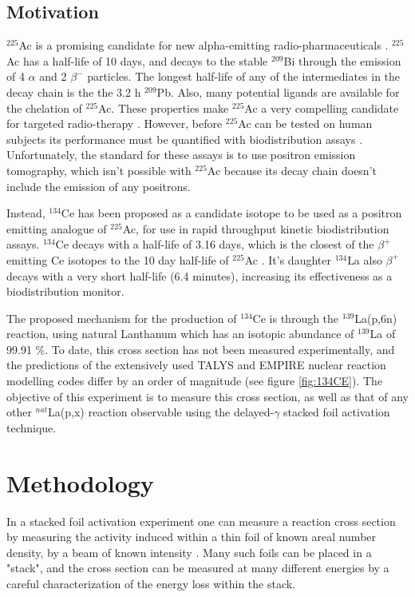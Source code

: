 \documentclass[aps,twocolumn,secnumarabic,balancelastpage,amsmath,amssymb,nofootinbib,floatfix]{revtex4-1}
\begin{document}
\subsection{Motivation}
$^{225}$Ac is a promising candidate for new alpha-emitting radio-pharmaceuticals \cite{BOLL2005667}.  $^{225}$Ac has a half-life of 10 days, and decays to the stable $^{209}$Bi through the emission of 4 $\alpha$ and 2 $\beta^-$ particles. The longest half-life of any of the intermediates in the decay chain is the the 3.2 h $^{209}$Pb.  Also, many potential ligands are available for the chelation of $^{225}$Ac.  These properties make $^{225}$Ac a very compelling candidate for targeted radio-therapy \cite{BOLL2005667}.  However, before $^{225}$Ac can be tested on human subjects its performance must be quantified with biodistribution assays \cite{doi:10.1021/ac0580114}.  Unfortunately, the standard for these assays is to use positron emission tomography, which isn't possible with $^{225}$Ac because its decay chain doesn't include the emission of any positrons.

Instead, $^{134}$Ce has been proposed as a candidate isotope to be used as a positron emitting analogue of $^{225}$Ac, for use in rapid throughput kinetic biodistribution assays.  $^{134}$Ce decays with a half-life of 3.16 days, which is the closest of the $\beta^+$ emitting Ce isotopes to the 10 day half-life of $^{225}$Ac \cite{ensdf}.  It's daughter $^{134}$La also $\beta^+$ decays with a very short half-life (6.4 minutes), increasing its effectiveness as a biodistribution monitor.  

The proposed mechanism for the production of $^{134}$Ce is through the $^{139}$La(p,6n) reaction, using natural Lanthanum which has an isotopic abundance of $^{139}$La of 99.91 \%.  To date, this cross section has not been measured experimentally, and the predictions of the extensively used TALYS \cite{TALYS} and EMPIRE \cite{HERMAN20072655} nuclear reaction modelling codes differ by an order of magnitude (see figure \ref{fig:134CE}).  The objective of this experiment is to measure this cross section, as well as that of any other $^{nat}$La(p,x) reaction observable using the delayed-$\gamma$ stacked foil activation technique.


\section{Methodology}
In a stacked foil activation experiment one can measure a reaction cross section by measuring the activity induced within a thin foil of known areal number density, by a beam of known intensity \cite{GRAVES201644}.  Many such foils can be placed in a "stack", and the cross section can be measured at many different energies by a careful characterization of the energy loss within the stack.
\end{document}
